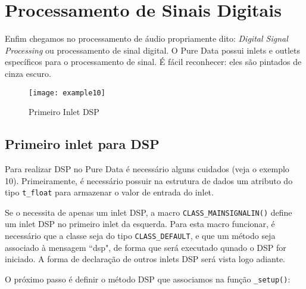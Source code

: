 
\chapter{Processamento de Sinais Digitais}


Enfim chegamos no processamento de áudio propriamente dito: \emph{Digital
Signal Processing} ou processamento de sinal digital. O Pure Data possui
inlets e outlets específicos para o processamento de sinal. É fácil
reconhecer: eles são pintados de cinza escuro.

\begin{figure}[h!]
\centering
\texttt{[image: example10]}
\caption{Primeiro Inlet DSP}
\end{figure}

\section{Primeiro inlet para DSP}

Para realizar DSP no Pure Data é necessário alguns cuidados (veja o exemplo
10). Primeiramente, é necessário possuir na estrutura de dados um atributo do
tipo \texttt{t\_float} para armazenar o valor de entrada do inlet.



Se o \external necessita de apenas um inlet DSP, a macro
\texttt{CLASS\_MAINSIGNALIN()} define um inlet DSP no primeiro inlet da
esquerda. Para esta macro funcionar, é necessário que a classe seja do tipo
\texttt{CLASS\_DEFAULT}, e que um método seja associado à mensagem ``dsp", de
forma que será executado qunado o DSP for iniciado. A forma de declaração de
outros inlets DSP será vista logo adiante.


 
O próximo passo é definir o método DSP que associamos na função
\texttt{\_setup()}:



